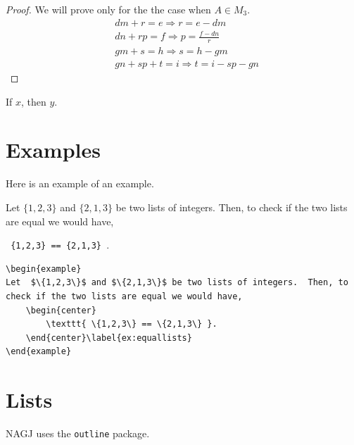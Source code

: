 \begin{proof} We will prove only for the the case when $A \in M_3$. \\
 \begin{align} 
&dm + r = e  \Rightarrow r = e-dm \label{eqn:1}\\
&dn + rp = f \Rightarrow p=\frac{f-dn}{r} \label{eqn:2}\\
&gm + s = h \Rightarrow s = h - gm \label{eqn:3}\\
&gn + sp + t = i \Rightarrow t  = i-sp-gn \label{eqn:4}
\end{align}
 
\end{proof} %
 

\begin{corollary}
If $x$, then $y$.
\end{corollary}



\section*{Examples}\label{ex:x1}
Here is an example of an example.


\begin{example}
Let  $\{1,2,3\}$ and $\{2,1,3\}$ be two lists of integers.  Then, to check if the two lists are equal we would have,   
	\begin{center}
		\texttt{ \{1,2,3\} == \{2,1,3\} }.
	\end{center}\label{ex:equallists}
\end{example}


\begin{verbatim}
\begin{example}
Let  $\{1,2,3\}$ and $\{2,1,3\}$ be two lists of integers.  Then, to check if the two lists are equal we would have,   
	\begin{center}
		\texttt{ \{1,2,3\} == \{2,1,3\} }.
	\end{center}\label{ex:equallists}
\end{example}
\end{verbatim}



 \section*{Lists}
 NAGJ uses the \verb|outline| package.   
  
